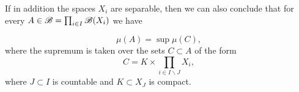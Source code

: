 \begin{remark}
    
    If in addition the spaces $X_i$ are separable, then we can also conclude that for every $A\in \mathscr{B}=\prod_{i\in I}\mathscr{B}(X_i)$ we have 

    \[\mu(A)=\sup\mu(C),\]
    where the supremum is taken over the sets $C\subset A$ of the form \[ C= K \times \prod_{i\in I\backslash J}X_i,\]
    where $J\subset I$ is countable and $K\subset X_J$ is compact.  
\end{remark}